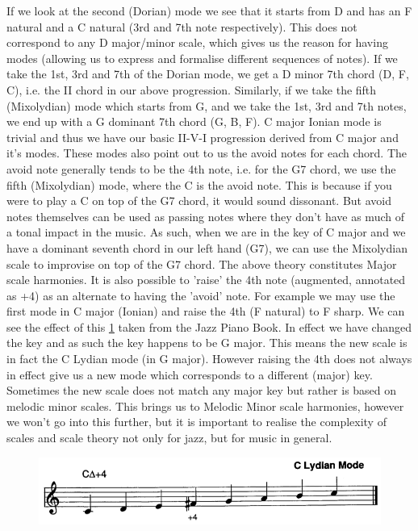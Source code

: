 \documentclass[pdftex,12pt,a4paper]{report}
\begin{document}
If we look at the second (Dorian) mode we see that it starts from D and has an F natural and a C natural (3rd and 7th note respectively). This does not correspond to any D major/minor scale, which gives us the reason for having modes (allowing us to express and formalise different sequences of notes). If we take the 1st, 3rd and 7th of the Dorian mode, we get a D minor 7th chord (D, F, C), i.e. the II chord in our above progression. Similarly, if we take the fifth (Mixolydian) mode which starts from G, and we take the 1st, 3rd and 7th notes, we end up with a G dominant 7th chord (G, B, F). C major Ionian mode is trivial and thus we have our basic II-V-I progression derived from C major and it's modes. 
These modes also point out to us the avoid notes for each chord. The avoid note generally tends to be the 4th note, i.e. for the G7 chord, we use the fifth (Mixolydian) mode, where the C is the avoid note. This is because if you were to play a C on top of the G7 chord, it would sound dissonant. But avoid notes themselves can be used as passing notes where they don't have as much of a tonal impact in the music. As such, when we are in the key of C major and we have a dominant seventh chord in our left hand (G7), we can use the Mixolydian scale to improvise on top of the G7 chord. The above theory constitutes Major scale harmonies. It is also possible to 'raise' the 4th note (augmented, annotated as +4) as an alternate to having the 'avoid' note. For example we may use the first mode in C major (Ionian) and raise the 4th (F natural) to F sharp. We can see the effect of this \ref{fig:clydian} taken from the Jazz Piano Book. In effect we have changed the key and as such the key happens to be G major. This means the new scale is in fact the C Lydian mode (in G major). However raising the 4th does not always in effect give us a new mode which corresponds to a different (major) key. Sometimes the new scale does not match any major key but rather is based on melodic minor scales. This brings us to Melodic Minor scale harmonies, however we won't go into this further, but it is important to realise the complexity of scales and scale theory not only for jazz, but for music in general.

\begin{figure}[here]
  \centering
  \includegraphics[scale=0.45]{figure/clydian.png}
  \label{fig:clydian}
\end{figure}
\end{document}
